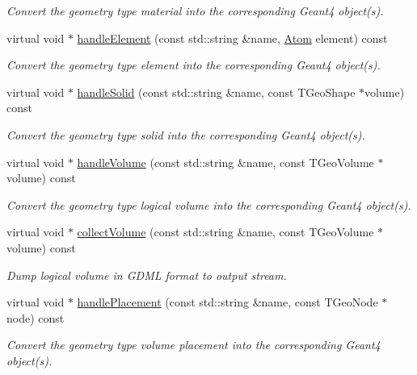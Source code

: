 \begin{DoxyCompactItemize}
\begin{DoxyCompactList}\small\item\em Convert the geometry type material into the corresponding Geant4 object(s). \end{DoxyCompactList}\item 
virtual void $\ast$ \hyperlink{class_d_d4hep_1_1_simulation_1_1_geant4_converter_a81befced0851d7ffe85411f755b9a7a2}{handle\+Element} (const std\+::string \&name, \hyperlink{class_d_d4hep_1_1_simulation_1_1_geant4_mapping_aa33a3f44904c6184ee883c244baa9554}{Atom} element) const
\begin{DoxyCompactList}\small\item\em Convert the geometry type element into the corresponding Geant4 object(s). \end{DoxyCompactList}\item 
virtual void $\ast$ \hyperlink{class_d_d4hep_1_1_simulation_1_1_geant4_converter_a62c57f774d5960afaca5be56562e0770}{handle\+Solid} (const std\+::string \&name, const T\+Geo\+Shape $\ast$volume) const
\begin{DoxyCompactList}\small\item\em Convert the geometry type solid into the corresponding Geant4 object(s). \end{DoxyCompactList}\item 
virtual void $\ast$ \hyperlink{class_d_d4hep_1_1_simulation_1_1_geant4_converter_abbdbb39ba21904e083ef924c1129884f}{handle\+Volume} (const std\+::string \&name, const T\+Geo\+Volume $\ast$volume) const
\begin{DoxyCompactList}\small\item\em Convert the geometry type logical volume into the corresponding Geant4 object(s). \end{DoxyCompactList}\item 
virtual void $\ast$ \hyperlink{class_d_d4hep_1_1_simulation_1_1_geant4_converter_af8ec25c8b47eaf4fcc2ccdad9d7fb17f}{collect\+Volume} (const std\+::string \&name, const T\+Geo\+Volume $\ast$volume) const
\begin{DoxyCompactList}\small\item\em Dump logical volume in G\+D\+ML format to output stream. \end{DoxyCompactList}\item 
virtual void $\ast$ \hyperlink{class_d_d4hep_1_1_simulation_1_1_geant4_converter_a3c7d877926c010d4f888245d6ccbbf19}{handle\+Placement} (const std\+::string \&name, const T\+Geo\+Node $\ast$node) const
\begin{DoxyCompactList}\small\item\em Convert the geometry type volume placement into the corresponding Geant4 object(s). \end{DoxyCompactList}\item 

\end{DoxyCompactItemize}
